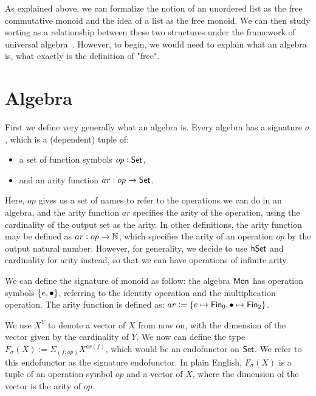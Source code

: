 \label{sec:universal-algebra}

As explained above, we can formalize the notion of an unordered list
as the free commutative monoid and the idea of a list as the free
monoid. We can then study sorting as a relationship between these
two structures under the framework of universal algebra~\cite{birkhoffStructureAbstractAlgebras1935}.
However, to begin, we would need to explain what an algebra is,
what exactly is the definition of "free".

\section{Algebra}\label{algebra:signature}
First we define very generally what an algebra is. Every algebra
has a signature $\sigma$, which is a (dependent) tuple of:
\begin{itemize}
    \item a set of function symbols $op : \mathsf{Set}$,
    \item and an arity function $ar : op \to \mathsf{Set}$.
\end{itemize}

Here, $op$ gives us a set of names to refer to the operations we can do
in an algebra, and the arity function $ar$ specifies the arity of the operation,
using the cardinality of the output set as the arity. In other definitions,
the arity function may be defined as $ar : op \to \mathbb{N}$, which specifies
the arity of an operation $op$ by the output natural number. However,
for generality, we decide to use $\mathsf{hSet}$ and cardinality for arity instead,
so that we can have operations of infinite arity. 

\begin{example}
We can define the signature of monoid as follow: the algebra $\mathsf{Mon}$
has operation symbols $\{ e, \mathbin{\bullet} \}$, referring to the identity operation
and the multiplication operation. The arity function is defined as:
$ar := \{ e \mapsto \Fin[0], \mult \mapsto \Fin[2] \}$.
\end{example}

We use $X^Y$ to denote a vector of $X$ from now on, with the dimension of
the vector given by the cardinality of $Y$. We now can define the type
$F_\sigma(X) := \Sigma_{(f: op)}X^{ar(f)}$, which would be an endofunctor
on $\mathsf{Set}$. We refer to this endofunctor as the signature endofunctor.
In plain English, $F_\sigma(X)$ is a tuple of an operation symbol $op$
and a vector of $X$, where the dimension of the vector is the arity of $op$.

